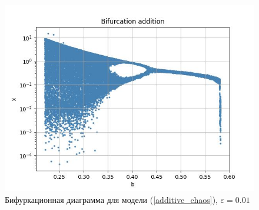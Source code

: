     \begin{figure}
        \centering
        \includegraphics[width=\textwidth]{stochastic/images/bifurcation_x_0_2_a_1_compare_additional_noise.jpg}
        
        \captionsetup{justification=centering}
        \caption{Бифуркационная диаграмма для модели (\ref{additive_chaos}), \(\varepsilon = 0.01\)}
        \label{bifurcation_x_0_2_a_1_compare_additional_noise}
    \end{figure}
